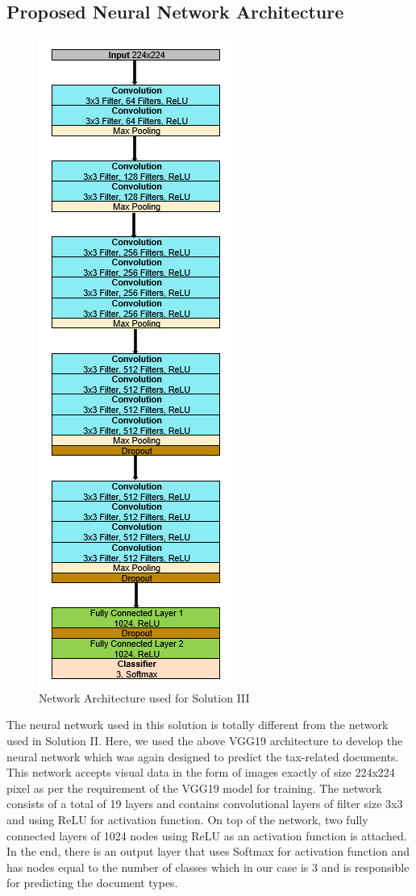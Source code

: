 \subsection{Proposed Neural Network Architecture}
\begin{figure}[H]
\centering
\includegraphics[scale=0.9]{images/Chapter5/sol_3/sol3_arch.png}
\caption{Network Architecture used for Solution III }
\label{network_arch_sol3}
\end{figure}
\par
The neural network used in this solution is totally different from the network used in Solution II. Here, we used the above VGG19 architecture to develop the neural network which was again designed to predict the tax-related documents. This network accepts visual data in the form of images exactly of size 224x224 pixel as per the requirement of the VGG19 model for training. The network consists of a total of 19 layers and contains convolutional layers of filter size 3x3 and using ReLU for activation function. On top of the network, two fully connected layers of 1024 nodes using ReLU as an activation function is attached. In the end, there is an output layer that uses Softmax for activation function and has nodes equal to the number of classes which in our case is 3 and is responsible for predicting the document types.
